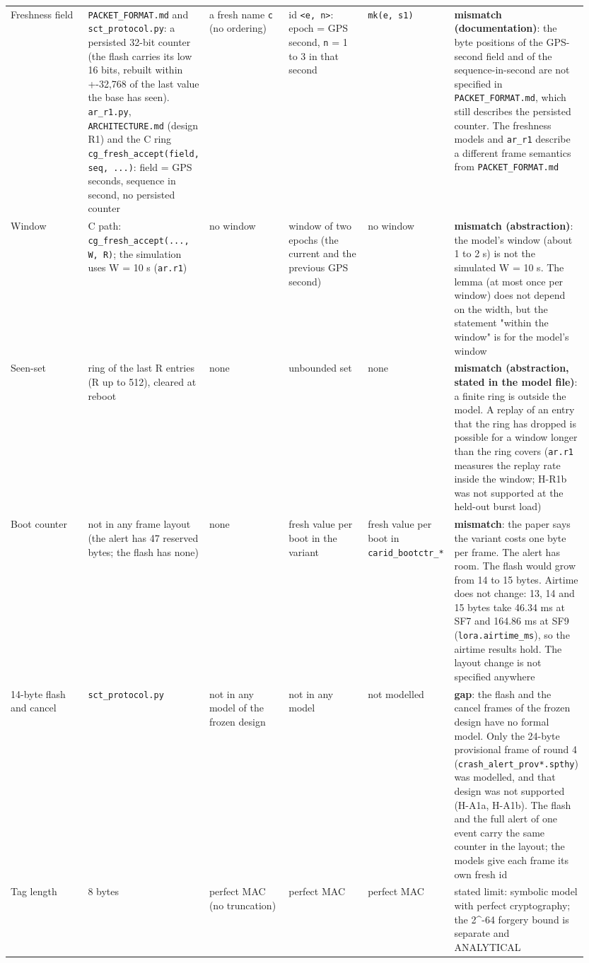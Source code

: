 {\begin{longtable}{p{0.158\linewidth}p{0.158\linewidth}p{0.158\linewidth}p{0.158\linewidth}p{0.158\linewidth}p{0.158\linewidth}}
Freshness field & \texttt{PACKET\_FORMAT.md} and \texttt{sct\_protocol.py}: a persisted 32-bit counter (the flash carries its low 16 bits, rebuilt within +-32,768 of the last value the base has seen). \texttt{ar\_r1.py}, \texttt{ARCHITECTURE.md} (design R1) and the C ring \texttt{cg\_fresh\_accept(field, seq, ...)}: field = GPS seconds, sequence in second, no persisted counter & a fresh name \texttt{c} (no ordering) & id \texttt{<e, n>}: epoch = GPS second, \texttt{n} = 1 to 3 in that second & \texttt{mk(e, s1)} & \textbf{mismatch (documentation)}: the byte positions of the GPS-second field and of the sequence-in-second are not specified in \texttt{PACKET\_FORMAT.md}, which still describes the persisted counter. The freshness models and \texttt{ar\_r1} describe a different frame semantics from \texttt{PACKET\_FORMAT.md} \\
Window & C path: \texttt{cg\_fresh\_accept(..., W, R)}; the simulation uses W = 10 s (\texttt{ar.r1}) & no window & window of two epochs (the current and the previous GPS second) & no window & \textbf{mismatch (abstraction)}: the model's window (about 1 to 2 s) is not the simulated W = 10 s. The lemma (at most once per window) does not depend on the width, but the statement "within the window" is for the model's window \\
Seen-set & ring of the last R entries (R up to 512), cleared at reboot & none & unbounded set & none & \textbf{mismatch (abstraction, stated in the model file)}: a finite ring is outside the model. A replay of an entry that the ring has dropped is possible for a window longer than the ring covers (\texttt{ar.r1} measures the replay rate inside the window; H-R1b was not supported at the held-out burst load) \\
Boot counter & not in any frame layout (the alert has 47 reserved bytes; the flash has none) & none & fresh value per boot in the variant & fresh value per boot in \texttt{carid\_bootctr\_*} & \textbf{mismatch}: the paper says the variant costs one byte per frame. The alert has room. The flash would grow from 14 to 15 bytes. Airtime does not change: 13, 14 and 15 bytes take 46.34 ms at SF7 and 164.86 ms at SF9 (\texttt{lora.airtime\_ms}), so the airtime results hold. The layout change is not specified anywhere \\
14-byte flash and cancel & \texttt{sct\_protocol.py} & not in any model of the frozen design & not in any model & not modelled & \textbf{gap}: the flash and the cancel frames of the frozen design have no formal model. Only the 24-byte provisional frame of round 4 (\texttt{crash\_alert\_prov*.spthy}) was modelled, and that design was not supported (H-A1a, H-A1b). The flash and the full alert of one event carry the same counter in the layout; the models give each frame its own fresh id \\
Tag length & 8 bytes & perfect MAC (no truncation) & perfect MAC & perfect MAC & stated limit: symbolic model with perfect cryptography; the 2\textasciicircum{}-64 forgery bound is separate and ANALYTICAL \\
\bottomrule
\end{longtable}}

